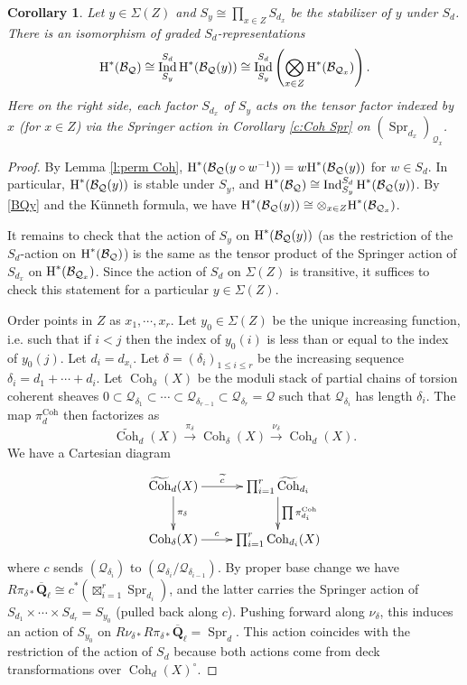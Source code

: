 \documentclass[reqno]{amsart}
\numberwithin{equation}{section}
\newcommand{\wt}[1]{\widetilde{#1}}
\newcommand{\Q}{\mathbf{Q}}
\DeclareMathOperator{\Ind}{Ind}
\DeclareMathOperator{\Coh}{Coh}
\DeclareMathOperator{\Spr}{Spr}
\newcommand{\Qlbar}{\overline{\Q}_\ell}
\newcommand\xr{\xrightarrow}
\newcommand\ot{\otimes}
\renewcommand\c{\circ}
\newcommand{\cohog}[2]{\textup{H}^{#1}({#2})}     %
\renewcommand\d\delta
\newcommand\cB{\mathcal{B}}
\newcommand\cQ{\mathcal{Q}}
\newtheorem{cor}[thm]{Corollary}
\theoremstyle{remark}
\numberwithin{equation}{section}
\begin{document}
\begin{cor}\label{c:Sind} Let $y\in \Sigma(Z)$ and $S_{y}\cong \prod_{x\in Z}S_{d_{x}}$ be the stabilizer of $y$ under $S_{d}$.  There is an isomorphism of graded $S_{d}$-representations
\begin{equation*}
\cohog{*}{\cB_{\cQ}}\cong \Ind^{S_{d}}_{S_{y}}\cohog{*}{\cB_{\cQ}(y)}\cong \Ind^{S_{d}}_{S_{y}}\left(\bigotimes_{x\in Z}\cohog{*}{\cB_{\cQ_{x}}}\right).
\end{equation*}
Here on the right side, each factor $S_{d_{x}}$ of $S_{y}$ acts on the tensor factor indexed by $x$ (for $x\in Z$) via the Springer action in Corollary \ref{c:Coh Spr} on $(\Spr_{d_{x}})_{\cQ_{x}}$.
\end{cor}
\begin{proof} By Lemma \ref{l:perm Coh},  $\cohog{*}{\cB_{\cQ}(y\c w^{-1})}=w\cohog{*}{\cB_{\cQ}(y)}$ for $w\in S_{d}$. In particular, $\cohog{*}{\cB_{\cQ}(y)}$ is stable under $S_{y}$, and  $\cohog{*}{\cB_{\cQ}}\cong \Ind^{S_{d}}_{S_{y}}\cohog{*}{\cB_{\cQ}(y)}$. By \eqref{BQy} and the K\"unneth formula, we have $\cohog{*}{\cB_{\cQ}(y)}\cong \ot_{x\in Z}\cohog{*}{\cB_{\cQ_{x}}}$. 

It remains to check that the action of $S_{y}$ on $\cohog{*}{\cB_{\cQ}(y)}$ (as the restriction of the $S_{d}$-action on $\cohog{*}{\cB_{\cQ}}$) is the same as the tensor product of the Springer action of $S_{d_{x}}$ on  $\cohog{*}{\cB_{\cQ_{x}}}$. Since the action of $S_{d}$ on $\Sigma(Z)$ is transitive, it suffices to check this statement for a particular $y\in \Sigma(Z)$. 

Order points in $Z$ as $x_{1},\cdots, x_{r}$.  Let $y_{0}\in \Sigma(Z)$ be the unique increasing function, i.e. such that if $i< j$ then the index of $y_0(i)$ is less than or equal to the index of $y_0(j)$. Let $d_{i}=d_{x_{i}}$. Let $\d=(\d_{i})_{1\le i\le r}$ be the increasing sequence $\d_{i}=d_{1}+\cdots+d_{i}$. Let $\Coh_{\d}(X)$ be the moduli stack of partial chains of torsion coherent sheaves $0\subset \cQ_{\d_{1}}\subset \cdots\subset \cQ_{\d_{r-1}}\subset \cQ_{\d_{r}}=\cQ$ such that $\cQ_{\d_{i}}$ has length $\d_{i}$. The map $\pi^{\Coh}_{d}$ then factorizes as
\begin{equation*}
\wt\Coh_{d}(X)\xr{\pi_{\d}}\Coh_{\d}(X)\xr{\nu_{\d}}\Coh_{d}(X).
\end{equation*}
We have a Cartesian diagram
\begin{equation}\label{partial Spr Coh}
\xymatrix{\wt\Coh_{d}(X)\ar[d]^{\pi_{\d}}\ar[r]^-{\wt c} & \prod_{i=1}^{r} \wt\Coh_{d_{i}}\ar[d]^{\prod\pi^{\Coh}_{d_{i}}} \\
\Coh_{\d}(X)\ar[r]^-{c} & \prod_{i=1}^{r}\Coh_{d_{i}}(X)}
\end{equation}
where $c$ sends $(\cQ_{\d_{i}})$ to $(\cQ_{\d_{i}}/\cQ_{\d_{i-1}})$. By proper base change we have $R\pi_{\d*}\Qlbar\cong c^{*}(\boxtimes_{i=1}^{r}\Spr_{d_{i}})$, and the latter carries the Springer action of $S_{d_{1}}\times\cdots\times S_{d_{r}}=S_{y_{0}}$ (pulled back along $c$). Pushing forward along $\nu_{\d}$, this induces an action of $S_{y_{0}}$ on $R\nu_{\d*}R\pi_{\d*}\Qlbar=\Spr_{d}$. This action coincides with the restriction of the action of $S_{d}$ because both actions come from deck transformations over $\Coh_{d}(X)^{\c}$. 


\end{proof}
\end{document}
